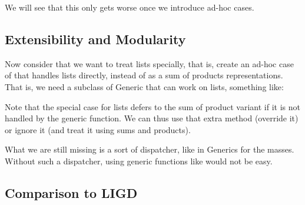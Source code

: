 We will see that this only gets worse once we introduce ad-hoc cases.


\subsection{Extensibility and Modularity}
Now consider that we want to treat lists specially, that is, create an
ad-hoc case of  that handles lists directly, instead of as a
sum of products representations. That is, we need a subclass of Generic
that can work on lists, something like:

Note that the special case for lists defers to the sum of product variant
if it is not handled by the generic function. We can thus use that extra
method (override it) or ignore it (and treat it using sums and products).


What we are still missing is a sort of dispatcher, like  in Generics
for the masses. Without such a dispatcher, using generic functions like
 would not be easy.

\subsection{Comparison to LIGD}
